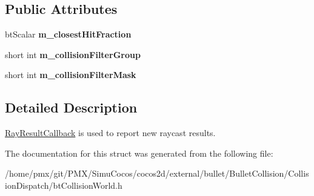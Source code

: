 \subsection*{Public Attributes}
\begin{DoxyCompactItemize}
\item 
\mbox{\label{structbtCollisionWorld_1_1ConvexResultCallback_ab40e7dba4b0e8a01de009c36a2ed3781}} 
bt\+Scalar {\bfseries m\+\_\+closest\+Hit\+Fraction}
\item 
\mbox{\label{structbtCollisionWorld_1_1ConvexResultCallback_a0c8c9e892543f594a8f1779d173b7418}} 
short int {\bfseries m\+\_\+collision\+Filter\+Group}
\item 
\mbox{\label{structbtCollisionWorld_1_1ConvexResultCallback_a0a37298dcedaa71458848f151d0642b3}} 
short int {\bfseries m\+\_\+collision\+Filter\+Mask}
\end{DoxyCompactItemize}


\subsection{Detailed Description}
\hyperlink{structbtCollisionWorld_1_1RayResultCallback}{Ray\+Result\+Callback} is used to report new raycast results. 

The documentation for this struct was generated from the following file\+:\begin{DoxyCompactItemize}
\item 
/home/pmx/git/\+P\+M\+X/\+Simu\+Cocos/cocos2d/external/bullet/\+Bullet\+Collision/\+Collision\+Dispatch/bt\+Collision\+World.\+h\end{DoxyCompactItemize}
